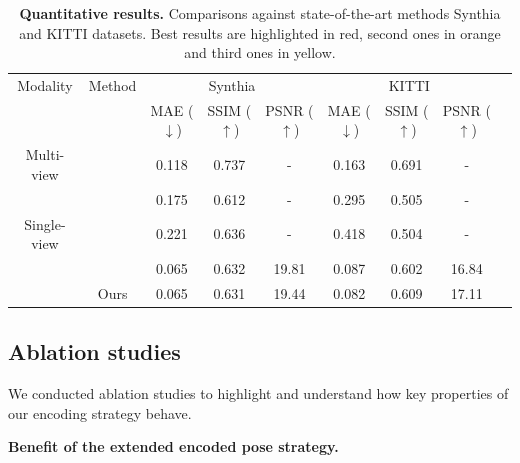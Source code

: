 \begin{table}[h!]
    \caption{\textbf{Quantitative results.} Comparisons against state-of-the-art methods Synthia \citep{ros2016synthia} and KITTI \citep{geiger2012we} datasets. Best results are highlighted in \colorbox{red!25}{red}, second ones in \colorbox{orange!25}{orange} and third ones in \colorbox{yellow!25}{yellow}. }
    \label{tab:2}
    \begin{center}%
    \begin{adjustbox}{width = \linewidth}
    \begin{tabular}[h]{c||cccccccc}
    \hline
     Modality & Method & \multicolumn{3}{c}{Synthia} & \multicolumn{3}{c}{KITTI} \\
     & &  MAE ($\downarrow$) & SSIM ($\uparrow$) & PSNR ($\uparrow$) & MAE ($\downarrow$) & SSIM ($\uparrow$) & PSNR ($\uparrow$)\\
    \hline
    Multi-view & \citep{sun2018multiview}& 0.118 & 0.737 & - & 0.163 & 0.691 & - \\
    \hline
     & \citep{tatarchenko2015single} & \cellcolor{orange!25}0.175 & 0.612 & - & \cellcolor{yellow!25}0.295 & \cellcolor{yellow!25}0.505 & -\\
     Single-view &  \citep{zhou2016view} & \cellcolor{yellow!25}0.221 & \cellcolor{red!25}0.636 & - & 0.418 & 0.504 & - \\
     &  \citep{kim2020novel} & \cellcolor{red!25}0.065 & \cellcolor{orange!25}0.632 &  \cellcolor{red!25}19.81 & \cellcolor{orange!25}0.087 & \cellcolor{orange!25}0.602 & \cellcolor{orange!25}16.84 \\
     & Ours & \cellcolor{red!25}0.065 & \cellcolor{yellow!25}0.631 & \cellcolor{orange!25}19.44 & \cellcolor{red!25}0.082 & \cellcolor{red!25}0.609 & \cellcolor{red!25}17.11 \\
    \hline 
    \end{tabular}
    \end{adjustbox}
    \end{center}
    \end{table}

\subsection{Ablation studies}
\label{sec:ablation}
We conducted ablation studies to highlight and understand how key properties of our encoding strategy behave. \newline

\textbf{Benefit of the extended encoded pose strategy.}

